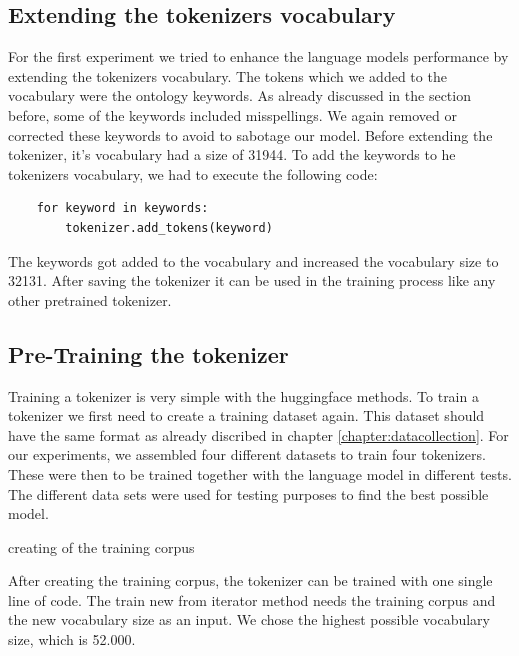 \subsection{Extending the tokenizers vocabulary}
For the first experiment we tried to enhance the language models performance by extending the tokenizers vocabulary. The tokens which we added to the vocabulary were the ontology keywords. As already discussed in the \alert{section before}, some of the keywords included misspellings. We again removed or corrected these keywords to avoid to sabotage our model. \newline
Before extending the tokenizer, it's vocabulary had a size of 31944. To add the keywords to he tokenizers vocabulary, we had to execute the following code:

\begin{code}
	\label{code:extend_tokenizer}
\begin{verbatim}
	for keyword in keywords:
		tokenizer.add_tokens(keyword)
\end{verbatim}
\end{code}

The keywords got added to the vocabulary and increased the vocabulary size to 32131. After saving the tokenizer it can be used in the training process like any other pretrained tokenizer.

\subsection{Pre-Training the tokenizer}\label{chapter:training-tokenizer}
Training a tokenizer is very simple with the\alert{ huggingface} methods. To train a tokenizer we first need to create a training dataset again. This dataset should have the same format as already discribed in chapter \ref{chapter:datacollection}. For our experiments, we assembled four different datasets to train four tokenizers. These were then to be trained together with the language model in different tests. The different data sets were used for testing purposes to find the best possible model.

\alert{creating of the training corpus}


After creating the training corpus, the tokenizer can be trained with one single line of code. The \alert{train new from iterator} method needs the training corpus and the new vocabulary size as an input. We chose the highest possible vocabulary size, which is 52.000.

